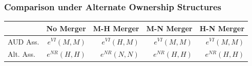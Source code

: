 \documentclass[aspectratio=169,11pt]{beamer}
\begin{document}
\begin{frame}
\frametitle{Comparison under Alternate Ownership Structures}
\begin{table}[htbp]
  \begin{center}
  \label{tab:merger}
    \begin{tabular}{|l | rrrr|}
\hline
          & No Merger & M-H Merger & M-N Merger & H-N Merger \\
\hline
     AUD Ass. & $e^{VI}(M,M)$ & $e^{VI}(H,M)$ & $e^{VI}(M,M)$ & $e^{VI}(M,M)$ \\
    Alt. Ass. & $e^{NR}(H,H)$ &  $e^{NR}(N,N)$ &  $e^{NR}(H,H)$ &  $e^{NR}(H,H)$ \\
    \hline
 

\end{tabular}
\end{center}
\end{table}
\end{frame}
\end{document}
